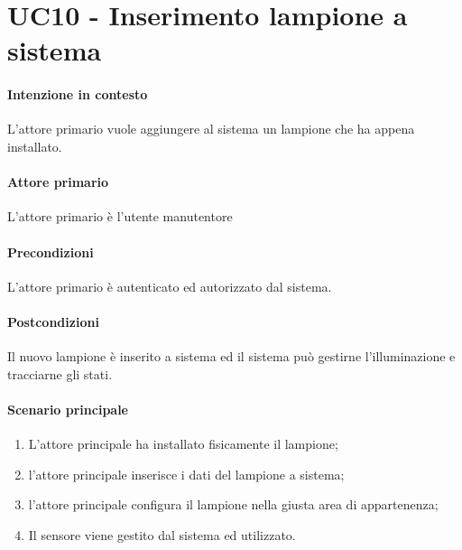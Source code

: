 \section{UC10 - Inserimento lampione a sistema}\label{uc:10}

\paragraph{Intenzione in contesto} L'attore primario vuole aggiungere al sistema un lampione che ha appena installato.

\paragraph{Attore primario} L'attore primario è l'utente manutentore

\paragraph{Precondizioni} L'attore primario è autenticato ed autorizzato dal sistema.

\paragraph{Postcondizioni} Il nuovo lampione è inserito a sistema ed il sistema può gestirne l'illuminazione e tracciarne gli stati.

\paragraph{Scenario principale}

\begin{enumerate}
    \item L'attore principale ha installato fisicamente il lampione;
    \item l'attore principale inserisce i dati del lampione a sistema;
    \item l'attore principale configura il lampione nella giusta area di appartenenza;
    \item Il sensore viene gestito dal sistema ed utilizzato.
\end{enumerate}
